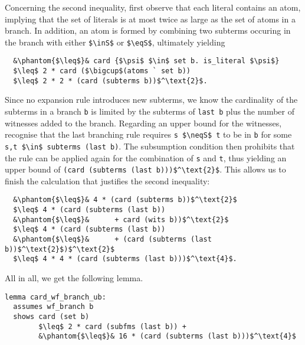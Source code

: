 \documentclass[sigplan,10pt,anonymous,review]{acmart}
\newcommand{\inS}{\in_\text{s}}
\newcommand{\eqS}{=_\text{s}}
\newcommand{\neqS}{\neq_\text{s}}
\begin{document}
Concerning the second inequality, first observe that each literal contains an atom, implying that the set of literals is at most twice as large as the set of atoms in a branch. 
In addition, an atom is formed by combining two subterms occuring in the branch with either \lstinline!$\inS$! or \lstinline!$\eqS$!, ultimately yielding
\begin{lstlisting}
  &\phantom{$\leq$}& card {$\psi$ $\in$ set b. is_literal $\psi$}
  $\leq$ 2 * card ($\bigcup$(atoms ` set b))
  $\leq$ 2 * 2 * (card (subterms b))$^\text{2}$.
\end{lstlisting}
Since no expansion rule introduces new subterms, we know the cardinality of the subterms in a branch \lstinline!b! is limited by the subterms of \lstinline!last b! plus the number of witnesses added to the branch.
Regarding an upper bound for the witnesses, recognise that the last branching rule requires \lstinline!s $\neqS$ t! to be in \lstinline!b! for some \lstinline!s,t $\in$ subterms (last b)!.
The subsumption condition then prohibits that the rule can be applied again for the combination of \lstinline!s! and \lstinline!t!, thus yielding an upper bound of \lstinline!(card (subterms (last b)))$^\text{2}$!.
This allows us to finish the calculation that justifies the second inequality:
\begin{lstlisting}
  &\phantom{$\leq$}& 4 * (card (subterms b))$^\text{2}$
  $\leq$ 4 * (card (subterms (last b))
  &\phantom{$\leq$}&      + card (wits b))$^\text{2}$
  $\leq$ 4 * (card (subterms (last b))
  &\phantom{$\leq$}&      + (card (subterms (last b))$^\text{2}$)$^\text{2}$
  $\leq$ 4 * 4 * (card (subterms (last b)))$^\text{4}$.
\end{lstlisting}
All in all, we get the following lemma.
\begin{lstlisting}[label={lst:card_branch}]
lemma card_wf_branch_ub:
  assumes wf_branch b
  shows card (set b)
        $\leq$ 2 * card (subfms (last b)) +
        &\phantom{$\leq$}& 16 * (card (subterms (last b)))$^\text{4}$
\end{lstlisting}
\end{document}
